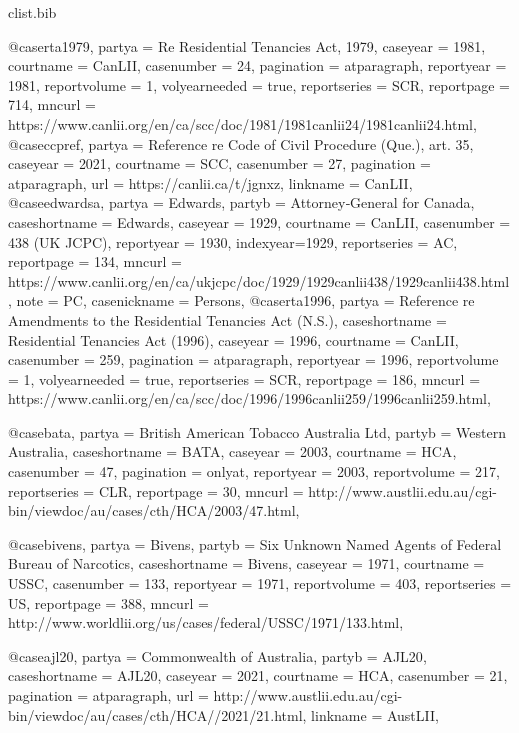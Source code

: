 \begin{filecontents*}[overwrite]{clist\jobname.bib}

@case{rta1979,	partya =  {Re Residential Tenancies Act, 1979},			caseyear =  {1981},	courtname =  {CanLII},	casenumber =  {24},	pagination =  {atparagraph},	reportyear =  {1981},	reportvolume =  {1},	volyearneeded =  {true},	reportseries =  {SCR},	reportpage =  {714},			mncurl =  {https://www.canlii.org/en/ca/scc/doc/1981/1981canlii24/1981canlii24.html},											}
@case{ccpref,	partya =  {Reference re Code of Civil Procedure (Que.), art. 35},			caseyear =  {2021},	courtname =  {SCC},	casenumber =  {27},	pagination =  {atparagraph},						url =  {https://canlii.ca/t/jgnxz},	linkname =  {CanLII},												}
@case{edwardsa,	partya =  {Edwards},	partyb =  {Attorney‑General for Canada},	caseshortname =  {Edwards},	caseyear =  {1929},	courtname =  {CanLII},	casenumber =  {438 (UK JCPC)},		reportyear =  {1930},	indexyear={1929},		reportseries =  {AC},	reportpage =  {134},			mncurl =  {https://www.canlii.org/en/ca/ukjcpc/doc/1929/1929canlii438/1929canlii438.html},						note =  {PC},		casenickname =  {Persons},			}
@case{rta1996,	partya =  {Reference re Amendments to the Residential Tenancies Act (N.S.)},		caseshortname =  {Residential Tenancies Act (1996)},	caseyear =  {1996},	courtname =  {CanLII},	casenumber =  {259},	pagination =  {atparagraph},	reportyear =  {1996},	reportvolume =  {1},	volyearneeded =  {true},	reportseries =  {SCR},	reportpage =  {186},			mncurl =  {https://www.canlii.org/en/ca/scc/doc/1996/1996canlii259/1996canlii259.html},											}

@case{bata,	partya =  {British American Tobacco Australia Ltd},	partyb =  {Western Australia},	caseshortname =  {BATA},	caseyear =  {2003},	courtname =  {HCA},	casenumber =  {47},	pagination =  {onlyat},	reportyear =  {2003},	reportvolume =  {217},		reportseries =  {CLR},	reportpage =  {30},			mncurl =  {http://www.austlii.edu.au/cgi-bin/viewdoc/au/cases/cth/HCA/2003/47.html},											}

@case{bivens,	partya =  {Bivens},	partyb =  {Six Unknown Named Agents of Federal Bureau of Narcotics},	caseshortname =  {Bivens},	caseyear =  {1971},	courtname =  {USSC},	casenumber =  {133},		reportyear =  {1971},	reportvolume =  {403},		reportseries =  {US},	reportpage =  {388},			mncurl =  {http://www.worldlii.org/us/cases/federal/USSC/1971/133.html},											}

@case{ajl20,	partya =  {Commonwealth of Australia},	partyb =  {AJL20},	caseshortname =  {AJL20},	caseyear =  {2021},	courtname =  {HCA},	casenumber =  {21},	pagination =  {atparagraph},						url =  {http://www.austlii.edu.au/cgi-bin/viewdoc/au/cases/cth/HCA//2021/21.html},	linkname =  {AustLII},												}


\end{filecontents*}
